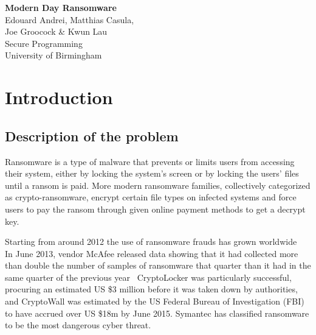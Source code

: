 \documentclass[10pt,a4paper]{article}
\begin{document}

\begin{titlepage}
  \vspace*{\fill}
  \begin{center}
    {\Huge \textbf{Modern Day Ransomware}}\\[0.5cm]
    {\Large Edouard Andrei, Matthias Casula,}\\
    {\Large Joe Groocock \& Kwun Lau}\\[0.6cm]
    {\large Secure Programming}\\
    {\large University of Birmingham}\\[0.4cm]
    {\large {}}
  \end{center}
  \vspace*{\fill}
  \tableofcontents
\end{titlepage}


\section{Introduction}
\subsection{Description of the problem}
Ransomware is a type of malware that prevents or limits users from accessing their system, either by locking the system's screen or by locking the users' files until a ransom is paid. More modern ransomware families, collectively categorized as crypto-ransomware, encrypt certain file types on infected systems and force users to pay the ransom through given online payment methods to get a decrypt key.\cite{trend}

Starting from around 2012 the use of ransomware frauds has grown worldwide~\cite{grown1}\cite{grown2} In June 2013, vendor McAfee released data showing that it had collected more than double the number of samples of ransomware that quarter than it had in the same quarter of the previous year~\cite{mcafee} CryptoLocker was particularly successful, procuring an estimated US \$3 million before it was taken down by authorities\cite{bbc}, and CryptoWall was estimated by the US Federal Bureau of Investigation (FBI) to have accrued over US \$18m by June 2015.\cite{cyberwall}
Symantec has classified ransomware to be the most dangerous cyber threat.~\cite{symantec}
\end{document}
